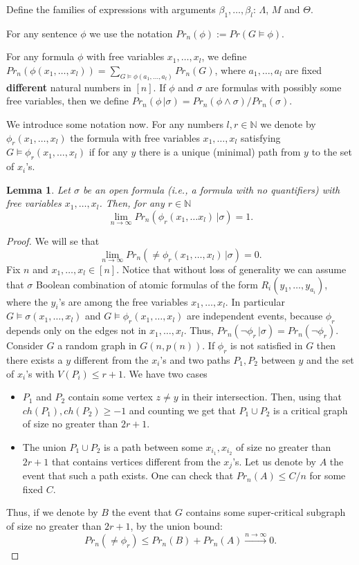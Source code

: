 \documentclass[11pt,notitlepage]{report}
\newtheorem{lemma}{Lemma}[chapter]
\theoremstyle{definition}
\theoremstyle{remark}
\newcommand{\N}{\mathbb{N}}
\newcommand{\Ln}{\lim\limits_{n\to \infty}}
\begin{document}
Define the families of expressions with arguments $\beta_1,\dots, \beta_l$: 
$\Lambda$, $M$ and $\Theta$. \par
For any sentence $\phi$ we use the notation 
$Pr_n(\phi):=Pr(G\models \phi)$. \par
For any formula $\phi$ with free variables 
$x_1, \dots, x_l$, we define $Pr_n(\phi(x_1,\dots,x_l))=
\sum\limits_{G\models \phi(a_1,\dots,a_l)} Pr_n(G) $, 
where $a_1, \dots, a_l$ are fixed \textbf{different}
natural numbers in $[n]$. If $\phi$ and $\sigma$ are 
formulas with possibly some free variables, then we define
$Pr_n(\phi \, | \sigma)=Pr_n(\phi\wedge \sigma)/Pr_n(\sigma)$. \par

We introduce some notation now. For any numbers $l,r\in \N$ 
we denote by $\phi_r(x_1,\dots, x_l)$ the formula
with free variables $x_1,\dots, x_l$
satisfying $G\models \phi_r(x_1,\dots, x_l)$ 
if for any $y$ there is a unique
(minimal) path from $y$ to the set of $x_i$'s. 

\begin{lemma}
	Let $\sigma$ be an open formula (i.e., a formula with no quantifiers)
	with free variables $x_1, \dots, x_l$. Then, for any $r\in \N$
	\[ \Ln Pr_n(\phi_r(x_1, \dots x_l) \, | \sigma ) =1 .\]
\end{lemma}
\begin{proof}
	We will se that
	\[ \Ln Pr_n(\neq \phi_r(x_1, \dots, x_l) \, | \sigma ) =0.\]
	Fix $n$ and $x_1,\dots, x_l \in [n]$.
    Notice that without loss of generality we can
	assume that $\sigma$ Boolean combination of atomic
	formulas of the form $R_i(y_1,\dots,y_{a_i})$, where the $y_i$'s
	are among the free variables $x_1,\dots, x_l$.
	In particular $G\models \sigma(x_1, \dots, x_l)$ and 
	$G\models \phi_r(x_1,\dots, x_l)$
	are independent events, because $\phi_r$ depends
	only on the edges not in $x_1,\dots, x_l$.
	Thus, $Pr_n(\neg \phi_r \, | \sigma)= Pr_n(\neg \phi_r)$.
	Consider $G$ a random graph in $G(n,p(n))$. 
	If $\phi_r$ is not satisfied in $G$ then 
	there exists a $y$ different from the $x_i$'s
	and two paths $P_1,P_2$ between $y$ and the set 
	of $x_i$'s with $V(P_i)\leq r+1$. We have two cases
	\begin{itemize}[leftmargin=*]
		\item $P_1$ and $P_2$ contain some vertex $z\neq y$
		in their intersection. Then, using that
		$ch(P_1), ch(P_2)\geq -1$ and counting we get that
		$P_1\cup P_2$ is a critical graph of size no greater
		than $2r+1$.
		\item The union $P_1\cup P_2$ is a path
		between some $x_{i_1}, x_{i_2}$ of size no greater
		than $2r+1$ that contains vertices different
		from the $x_j$'s. Let us denote by $A$ the event that
		such a path exists. One can check that $Pr_n(A)\leq C/n$
		for some fixed $C$.   	
	\end{itemize}
	Thus, if we denote by $B$ the event that $G$ contains some 
	super-critical subgraph of size no greater than $2r+1$,  by the
	union bound:
	\[ Pr_n(\neq \phi_r)\leq  Pr_n(B)+ Pr_n(A) 
	\stackrel{n\to \infty}{\longrightarrow}	0.\]
\end{proof}
\end{document}

